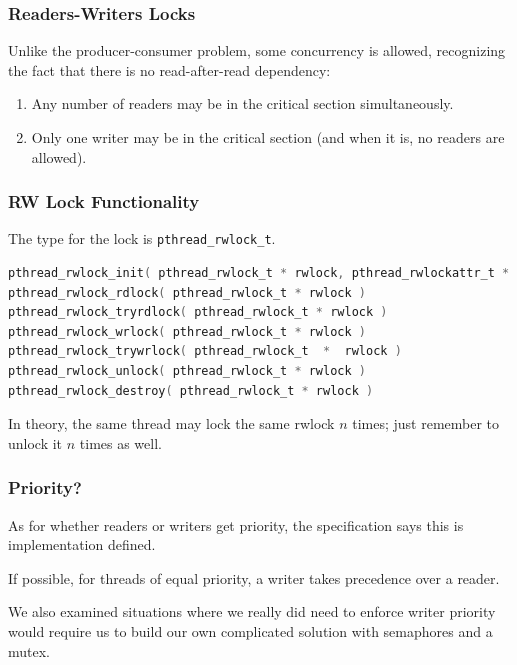 \begin{frame}
\frametitle{Readers-Writers Locks}

Unlike the producer-consumer problem, some concurrency is allowed, recognizing the fact that there is no read-after-read dependency:

\begin{enumerate}
	\item Any number of readers may be in the critical section simultaneously.
	\item Only one writer may be in the critical section (and when it is, no readers are allowed).
\end{enumerate}


\end{frame}

\begin{frame}[fragile]
\frametitle{RW Lock Functionality}

The type for the lock is \texttt{pthread\_rwlock\_t}. 

\begin{lstlisting}[language=C]
pthread_rwlock_init( pthread_rwlock_t * rwlock, pthread_rwlockattr_t * attr )
pthread_rwlock_rdlock( pthread_rwlock_t * rwlock )
pthread_rwlock_tryrdlock( pthread_rwlock_t * rwlock )
pthread_rwlock_wrlock( pthread_rwlock_t * rwlock )
pthread_rwlock_trywrlock( pthread_rwlock_t  *  rwlock )
pthread_rwlock_unlock( pthread_rwlock_t * rwlock )
pthread_rwlock_destroy( pthread_rwlock_t * rwlock )
\end{lstlisting}

In theory, the same thread may lock the same rwlock $n$ times; just remember to unlock it $n$ times as well. 

\end{frame}

\begin{frame}
\frametitle{Priority?}

As for whether readers or writers get priority, the specification says this is implementation defined. 

If possible, for threads of equal priority, a writer takes precedence over a reader. 

We also examined situations where we really did need to enforce writer priority would require us to build our own complicated solution with semaphores and a mutex.

\end{frame}

